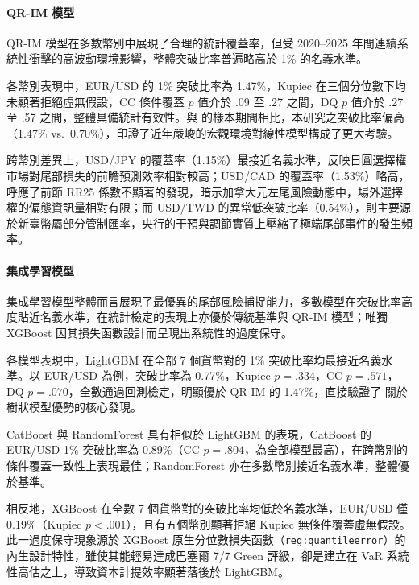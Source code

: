 \paragraph{QR-IM 模型}\label{sec:perf_qrim}

QR-IM 模型在多數幣別中展現了合理的統計覆蓋率，但受 2020–2025 年間連續系統性衝擊的高波動環境影響，整體突破比率普遍略高於 1\% 的名義水準。

各幣別表現中，EUR/USD 的 1\% 突破比率為 1.47\%，Kupiec 在三個分位數下均未顯著拒絕虛無假設，CC 條件覆蓋 $p$ 值介於 .09 至 .27 之間，DQ $p$ 值介於 .27 至 .57 之間，整體具備統計有效性。與 \citet{blom2023estimating} 的樣本期間相比，本研究之突破比率偏高（1.47\% vs.\ 0.70\%），印證了近年嚴峻的宏觀環境對線性模型構成了更大考驗。

跨幣別差異上，USD/JPY 的覆蓋率（1.15\%）最接近名義水準，反映日圓選擇權市場對尾部損失的前瞻預測效率相對較高；USD/CAD 的覆蓋率（1.53\%）略高，呼應了前節 RR25 係數不顯著的發現，暗示加拿大元左尾風險動態中，場外選擇權的偏態資訊量相對有限；而 USD/TWD 的異常低突破比率（0.54\%），則主要源於新臺幣屬部分管制匯率，央行的干預與調節實質上壓縮了極端尾部事件的發生頻率。

\paragraph{集成學習模型}\label{sec:perf_ensemble}

集成學習模型整體而言展現了最優異的尾部風險捕捉能力，多數模型在突破比率高度貼近名義水準，在統計檢定的表現上亦優於傳統基準與 QR-IM 模型；唯獨 XGBoost 因其損失函數設計而呈現出系統性的過度保守。

各模型表現中，LightGBM 在全部 7 個貨幣對的 1\% 突破比率均最接近名義水準。以 EUR/USD 為例，突破比率為 0.77\%，Kupiec $p = .334$，CC $p = .571$，DQ $p = .070$，全數通過回測檢定，明顯優於 QR-IM 的 1.47\%，直接驗證了 \citet{blom2023estimating} 關於樹狀模型優勢的核心發現。

CatBoost 與 RandomForest 具有相似於 LightGBM 的表現，CatBoost 的 EUR/USD 1\% 突破比率為 0.89\%（CC $p = .804$，為全部模型最高），在跨幣別的條件覆蓋一致性上表現最佳；RandomForest 亦在多數幣別接近名義水準，整體優於基準。

相反地，XGBoost 在全數 7 個貨幣對的突破比率均低於名義水準，EUR/USD 僅 0.19\%（Kupiec $p < .001$），且有五個幣別顯著拒絕 Kupiec 無條件覆蓋虛無假設。此一過度保守現象源於 XGBoost 原生分位數損失函數（\texttt{reg:quantileerror}）的內生設計特性，雖使其能輕易達成巴塞爾 7/7 Green 評級，卻是建立在 VaR 系統性高估之上，導致資本計提效率顯著落後於 LightGBM。

